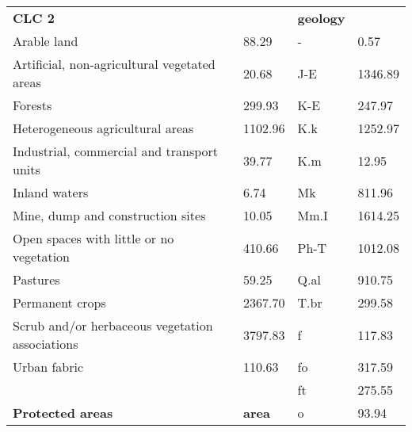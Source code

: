 \begin{longtable}{llll}
\textbf{CLC 2}                                     &               & \textbf{geology}                           &                  \\
Arable land                                        & 88.29         & -                                          & 0.57             \\
Artificial, non-agricultural vegetated areas       & 20.68         & J-E                                        & 1346.89          \\
Forests                                            & 299.93        & K-E                                        & 247.97           \\
Heterogeneous agricultural areas                   & 1102.96       & K.k                                        & 1252.97          \\
Industrial, commercial and transport units         & 39.77         & K.m                                        & 12.95            \\
Inland waters                                      & 6.74          & Mk                                         & 811.96           \\
Mine, dump and construction sites                  & 10.05         & Mm.I                                       & 1614.25          \\
Open spaces with little or no vegetation           & 410.66        & Ph-T                                       & 1012.08          \\
Pastures                                           & 59.25         & Q.al                                       & 910.75           \\
Permanent crops                                    & 2367.70       & T.br                                       & 299.58           \\
Scrub and/or herbaceous vegetation associations    & 3797.83       & f                                          & 117.83           \\
Urban fabric                                       & 110.63        & fo                                         & 317.59           \\
                                                   &               & ft                                         & 275.55           \\
\textbf{Protected areas}                           & \textbf{area} & o                                          & 93.94            \\

\end{longtable}
